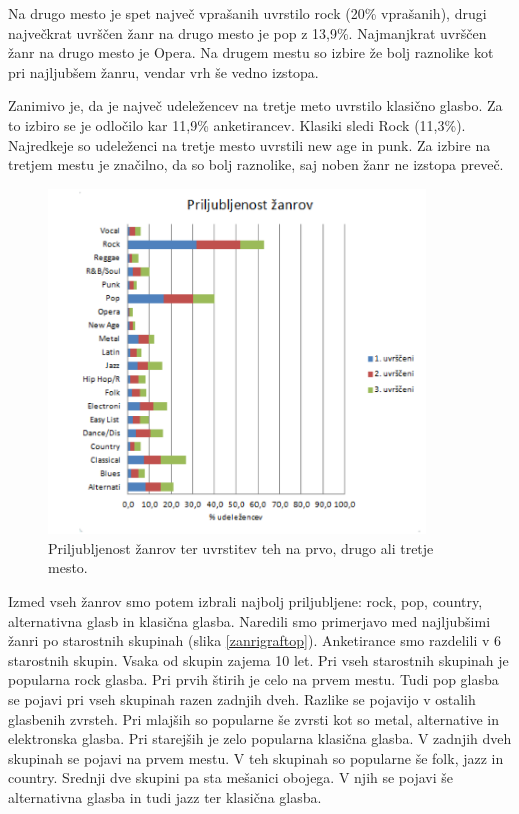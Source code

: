 \documentclass[a4paper, 12pt]{book}
\begin{document}
{Na drugo mesto je spet največ vprašanih uvrstilo rock (20\% vprašanih), drugi največkrat uvrščen žanr na drugo mesto je pop z 13,9\%. Najmanjkrat uvrščen žanr na drugo mesto je Opera. Na drugem mestu so izbire že bolj raznolike kot pri najljubšem žanru, vendar vrh še vedno izstopa. 

Zanimivo je, da je največ udeležencev na tretje meto uvrstilo klasično glasbo. Za to izbiro se je odločilo kar 11,9\% anketirancev. Klasiki sledi Rock (11,3\%). Najredkeje so udeleženci na tretje mesto uvrstili new age in punk. Za izbire na tretjem mestu je značilno, da so bolj raznolike, saj noben žanr ne izstopa preveč. 

\begin{figure}[hbt]
\centering
\includegraphics[width=10cm]{images/genre.png}

\caption{Priljubljenost žanrov ter uvrstitev teh na prvo, drugo ali tretje mesto.  }
\label{zanrigraf}
\end{figure}

Izmed vseh žanrov smo potem izbrali najbolj priljubljene: rock, pop, country, alternativna glasb in klasična glasba. Naredili smo primerjavo med najljubšimi žanri po starostnih skupinah (slika \ref{zanrigraftop}). Anketirance smo razdelili v 6 starostnih skupin. Vsaka od skupin zajema 10 let. Pri vseh starostnih skupinah je popularna rock glasba. Pri prvih štirih je celo na prvem mestu. Tudi pop glasba se pojavi pri vseh skupinah razen zadnjih dveh. Razlike se pojavijo v ostalih glasbenih zvrsteh. Pri mlajših so popularne še zvrsti kot so metal, alternative in elektronska glasba. Pri starejših je zelo popularna klasična glasba. V zadnjih dveh skupinah se pojavi na prvem mestu. V teh skupinah so popularne še folk, jazz in country. Srednji dve skupini pa sta mešanici obojega. V njih se pojavi še alternativna glasba in tudi jazz ter klasična glasba. 

}
\end{document}

